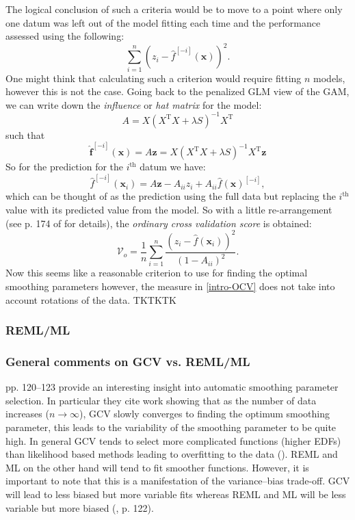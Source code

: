 The logical conclusion of such a criteria would be to move to a point where only one datum was left out of the model fitting each time and the performance assessed using the following:
\begin{equation}
\sum_{i=1}^n (z_i - \hat{f}^{[-i]}(\mathbf{x}))^2.
\end{equation}
One might think that calculating such a criterion would require fitting $n$ models, however this is not the case. Going back to the penalized GLM view of the GAM, we can write down the \textit{influence} or \textit{hat matrix} for the model:
\begin{equation*}
A = X(X^\text{T}X + \lambda S)^{-1}X^\text{T}
\end{equation*}
such that
\begin{equation*}
\mathbf{\hat{f}}^{[-i]}(\mathbf{x}) = A\mathbf{z} = X(X^\text{T}X + \lambda S)^{-1}X^\text{T}\mathbf{z}
\end{equation*}
So for the prediction for the $i^\text{th}$ datum we have:
\begin{equation*}
\hat{f}^{[-i]}(\mathbf{x}_i) = A\mathbf{z} - A_{ii}z_i + A_{ii}\hat{f}(\mathbf{x})^{[-i]},
\end{equation*}
which can be thought of as the prediction using the full data but replacing the $i^\text{th}$ value with its predicted value from the model. So with a little re-arrangement (see p. 174 of \cite{simonbook} for details), the \textit{ordinary cross validation score} is obtained:
\begin{equation}
\mathcal{V}_o = \frac{1}{n} \sum_{i=1}^n \frac{(z_i - \hat{f}(\mathbf{x}_i))^2}{(1-A_{ii})^2}.
\label{intro-OCV}
\end{equation}
Now this seems like a reasonable criterion to use for finding the optimal smoothing parameters however, the measure in \ref{intro-OCV} does not take into account rotations of the data. TKTKTK


\subsubsection{REML/ML}


\subsubsection{General comments on GCV vs. REML/ML}

\cite{rwc} pp. 120--123 provide an interesting insight into automatic smoothing parameter selection. In particular they cite work showing that as the number of data increases ($n\rightarrow\infty$), GCV slowly converges to finding the optimum smoothing parameter, this leads to the variability of the smoothing parameter to be quite high. In general GCV tends to select more complicated functions (higher EDFs) than likelihood based methods leading to overfitting to the data (\cite{remlpaper}). REML and ML on the other hand will tend to fit smoother functions. However, it is important to note that this is a manifestation of the variance--bias trade-off. GCV will lead to less biased but more variable fits whereas REML and ML will be less variable but more biased (\cite{rwc}, p. 122).



